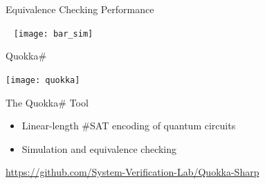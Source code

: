 \begin{refframe}{Equivalence Checking Performance}

~
\hspace{-1.5cm}
	\texttt{[image: bar\_sim]}


\end{refframe}



\begin{refframe}{Quokka\#}

	\centering

\vspace{-4em}
	\texttt{[image: quokka]}
	
	
\begin{alertblock}{The Quokka\# Tool}
	\begin{itemize}
		\item Linear-length \#SAT encoding of quantum circuits
		\item Simulation and equivalence checking
	\end{itemize}
	
	
\end{alertblock}

	
	\url{https://github.com/System-Verification-Lab/Quokka-Sharp}
	
	
\end{refframe}




